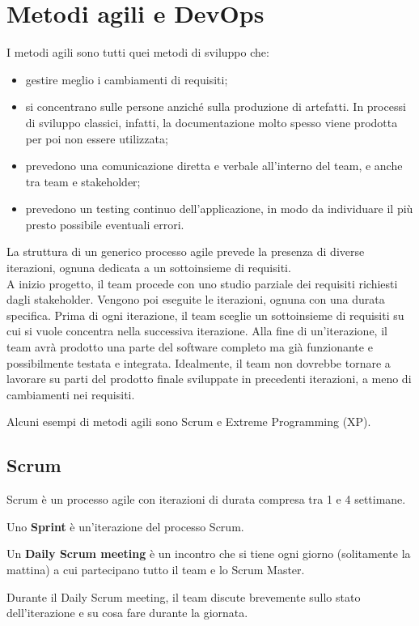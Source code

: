 \chapter{Metodi agili e DevOps}
I metodi agili sono tutti quei metodi di sviluppo che:
\begin{itemize}
    \item gestire meglio i cambiamenti di requisiti;
    \item si concentrano sulle persone anziché sulla produzione di artefatti. In processi di sviluppo classici, infatti, la documentazione molto spesso viene prodotta per poi non essere utilizzata;
    \item prevedono una comunicazione diretta e verbale all'interno del team, e anche tra team e stakeholder;
    \item prevedono un testing continuo dell'applicazione, in modo da individuare il più presto possibile eventuali errori.
\end{itemize}

La struttura di un generico processo agile prevede la presenza di diverse iterazioni, ognuna dedicata a un sottoinsieme di requisiti.\\
A inizio progetto, il team procede con uno studio parziale dei requisiti richiesti dagli stakeholder.
Vengono poi eseguite le iterazioni, ognuna con una durata specifica. Prima di ogni iterazione, il team sceglie un sottoinsieme di requisiti su cui si vuole concentra nella successiva iterazione.
Alla fine di un'iterazione, il team avrà prodotto una parte del software completo ma già funzionante e possibilmente testata e integrata.
Idealmente, il team non dovrebbe tornare a lavorare su parti del prodotto finale sviluppate in precedenti iterazioni, a meno di cambiamenti nei requisiti.

Alcuni esempi di metodi agili sono Scrum e Extreme Programming (XP).

\section{Scrum}
Scrum è un processo agile con iterazioni di durata compresa tra 1 e 4 settimane.

\begin{defn}
    Uno \textbf{Sprint} è un'iterazione del processo Scrum.
\end{defn}

\begin{defn}
    Un \textbf{Daily Scrum meeting} è un incontro che si tiene ogni giorno (solitamente la mattina) a cui partecipano tutto il team e lo Scrum Master.

    Durante il Daily Scrum meeting, il team discute brevemente sullo stato dell'iterazione e su cosa fare durante la giornata.
\end{defn}


